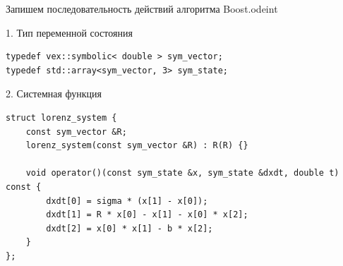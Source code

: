 \documentclass[@BEAMER_OPTIONS@]{beamer}
\begin{document}

\begin{frame}[fragile]{Запишем последовательность действий алгоритма Boost.odeint}
    \begin{exampleblock}{1. Тип переменной состояния}
        \begin{lstlisting}
typedef vex::symbolic< double > sym_vector;
typedef std::array<sym_vector, 3> sym_state;
        \end{lstlisting}
    \end{exampleblock}

    \begin{exampleblock}{2. Системная функция}
        \begin{lstlisting}[firstnumber=last]
struct lorenz_system {
    const sym_vector &R;
    lorenz_system(const sym_vector &R) : R(R) {}

    void operator()(const sym_state &x, sym_state &dxdt, double t) const {
        dxdt[0] = sigma * (x[1] - x[0]);
        dxdt[1] = R * x[0] - x[1] - x[0] * x[2];
        dxdt[2] = x[0] * x[1] - b * x[2];
    }
};
        \end{lstlisting}
    \end{exampleblock}
\end{frame}

\end{document}
